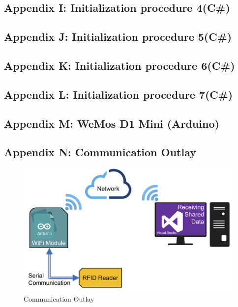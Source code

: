 \subsection{Appendix I: Initialization procedure 4(C\#)}\label{Sec_AppI}
\scriptsize


\subsection{Appendix J: Initialization procedure 5(C\#)}\label{Sec_AppJ}
\scriptsize


\subsection{Appendix K: Initialization procedure 6(C\#)}\label{Sec_AppK}
\scriptsize


\subsection{Appendix L: Initialization procedure 7(C\#)}\label{Sec_AppL}
\scriptsize


\pagebreak
\subsection{Appendix M: WeMos D1 Mini (Arduino)}\label{Sec_AppM}
\scriptsize

\pagebreak

\subsection{Appendix N: Communication Outlay}\label{Sec_AppN}
\begin{figure}[!htbp]
	\centering
	\includegraphics[width = 15cm]{Pictures/communication}
	\caption{Communication Outlay}
	\label{com}
\end{figure}
\pagebreak
